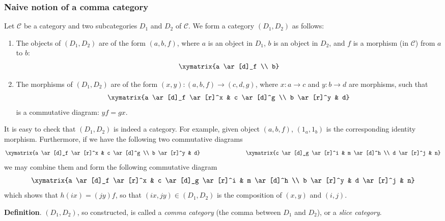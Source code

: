 \documentclass[12pt]{article}
\begin{document}
\subsubsection*{Naive notion of a comma category}
Let $\mathcal{C}$ be a category and two subcategories $D_1$ and $D_2$ of $\mathcal{C}$.  We form a category $(D_1,D_2)$ as follows:

\begin{enumerate}
\item The objects of $(D_1,D_2)$ are of the form $(a,b,f)$, where $a$ is an object in $D_1$, $b$ is an object in $D_2$, and $f$ is a morphism (in $\mathcal{C}$) from $a$ to $b$:
\[
\xymatrix{a \ar[d]_f \\ b}
\]
\item The morphisms of $(D_1,D_2)$ are of the form $(x,y):(a,b,f)\to (c,d,g)$, where $x:a\to c$ and $y:b\to d$ are morphisms, such that 
\[
\xymatrix{a \ar[d]_f \ar[r]^x & c \ar[d]^g \\
b \ar[r]^y & d}
\]
is a commutative diagram: $yf = gx$.
\end{enumerate}

It is easy to check that $(D_1,D_2)$ is indeed a category.  For 
example, given object $(a,b,f)$, $(1_a,1_b)$ is the corresponding identity 
morphism.  Furthermore, if we have the following two commutative diagrams
\[
\xymatrix{a \ar[d]_f \ar[r]^x & c \ar[d]^g \\
b \ar[r]^y & d}
\qquad\qquad\qquad\qquad
\xymatrix{c \ar[d]_g \ar[r]^i & m \ar[d]^h \\
d \ar[r]^j & n}
\]
we may combine them and form the following commutative diagram
\[
\xymatrix{a \ar[d]_f \ar[r]^x & c \ar[d]_g \ar[r]^i & m \ar[d]^h \\
b \ar[r]^y & d \ar[r]^j & n}
\]
which shows that $h(ix)=(jy)f$, so that $(ix,jy)\in (D_1,D_2)$ is the 
composition of $(x,y)$ and $(i,j)$.

\textbf{Definition}.  $(D_1,D_2)$, so constructed, is called a \emph{comma category} (the 
comma between $D_1$ and $D_2$), or a \emph{slice category}.
\end{document}
